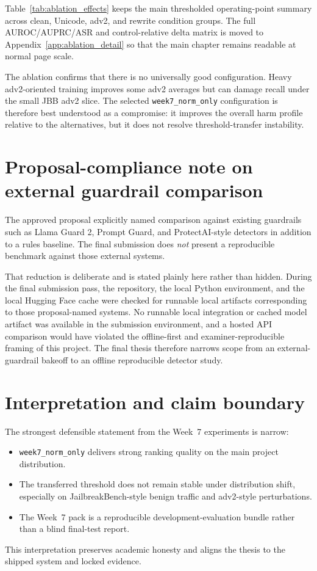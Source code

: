 Table~\ref{tab:ablation_effects} keeps the main thresholded operating-point summary across clean, Unicode, adv2, and rewrite condition groups. The full AUROC/AUPRC/ASR and control-relative delta matrix is moved to Appendix~\ref{app:ablation_detail} so that the main chapter remains readable at normal page scale.



The ablation confirms that there is no universally good configuration. Heavy adv2-oriented training improves some adv2 averages but can damage recall under the small JBB adv2 slice. The selected \texttt{week7\_norm\_only} configuration is therefore best understood as a compromise: it improves the overall harm profile relative to the alternatives, but it does not resolve threshold-transfer instability.

\section{Proposal-compliance note on external guardrail comparison}

The approved proposal explicitly named comparison against existing guardrails such as Llama Guard 2, Prompt Guard, and ProtectAI-style detectors in addition to a rules baseline. The final submission does \emph{not} present a reproducible benchmark against those external systems.

That reduction is deliberate and is stated plainly here rather than hidden. During the final submission pass, the repository, the local Python environment, and the local Hugging Face cache were checked for runnable local artifacts corresponding to those proposal-named systems. No runnable local integration or cached model artifact was available in the submission environment, and a hosted API comparison would have violated the offline-first and examiner-reproducible framing of this project. The final thesis therefore narrows scope from an external-guardrail bakeoff to an offline reproducible detector study.

\section{Interpretation and claim boundary}

The strongest defensible statement from the Week~7 experiments is narrow:
\begin{itemize}
  \item \texttt{week7\_norm\_only} delivers strong ranking quality on the main project distribution.
  \item The transferred threshold does not remain stable under distribution shift, especially on JailbreakBench-style benign traffic and adv2-style perturbations.
  \item The Week~7 pack is a reproducible development-evaluation bundle rather than a blind final-test report.
\end{itemize}

This interpretation preserves academic honesty and aligns the thesis to the shipped system and locked evidence.


